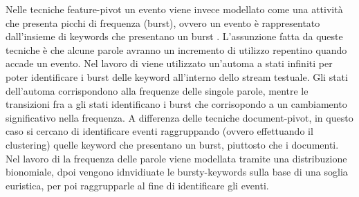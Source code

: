 Nelle tecniche feature-pivot un evento viene invece modellato come una attività che presenta picchi di frequenza (burst), ovvero un evento è rappresentato dall'insieme di keywords che presentano un burst \cite{Allan:2002:TDT:772260}. L'assunzione fatta da queste tecniche è che alcune parole avranno un incremento di utilizzo repentino quando accade un evento. Nel lavoro di \cite{Kleinberg:2002:BHS:775047.775061} viene utilizzato un'automa a stati infiniti per poter identificare i burst delle keyword all'interno dello stream testuale. Gli stati dell'automa corrispondono alla frequenze delle singole parole, mentre le transizioni fra a gli stati identificano i burst che corrisopondo a un  cambiamento significativo nella frequenza.
A differenza delle tecniche document-pivot, in questo caso si cercano di identificare eventi raggruppando (ovvero effettuando il clustering)   quelle keyword che presentano un burst, piuttosto che i documenti. Nel lavoro di \cite{Allan:2002:TDT:772260} la frequenza delle parole viene modellata tramite una distribuzione bionomiale, dpoi vengono idnvidiuate le bursty-keywords sulla base di una soglia euristica, per poi raggrupparle al fine di identificare gli eventi.
